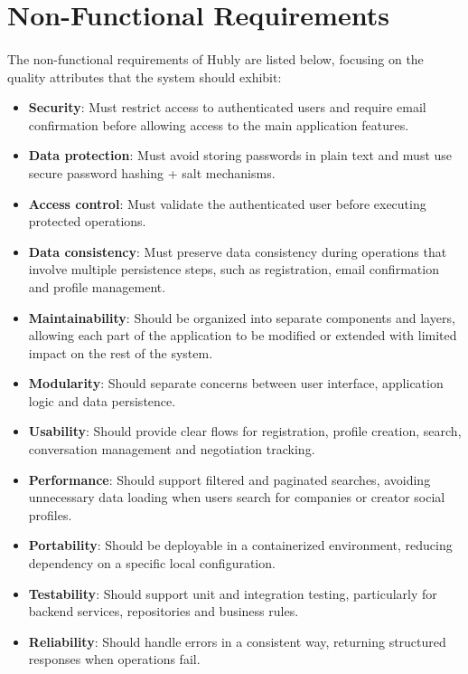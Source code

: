 \section{Non-Functional Requirements}
\paragraph{}The non-functional requirements of Hubly are listed below, focusing on the quality attributes that the system should exhibit:

\begin{itemize}
    \item \textbf{Security}: Must restrict access to authenticated users and require email confirmation before allowing access to the main application features.

    \item \textbf{Data protection}: Must avoid storing passwords in plain text and must use secure password hashing + salt mechanisms.

    \item \textbf{Access control}: Must validate the authenticated user before executing protected operations.

    \item \textbf{Data consistency}: Must preserve data consistency during operations that involve multiple persistence steps, such as registration, email confirmation and profile management.

    \item \textbf{Maintainability}: Should be organized into separate components and layers, allowing each part of the application to be modified or extended with limited impact on the rest of the system.

    \item \textbf{Modularity}: Should separate concerns between user interface, application logic and data persistence.

    \item \textbf{Usability}: Should provide clear flows for registration, profile creation, search, conversation management and negotiation tracking.

    \item \textbf{Performance}: Should support filtered and paginated searches, avoiding unnecessary data loading when users search for companies or creator social profiles.

    \item \textbf{Portability}: Should be deployable in a containerized environment, reducing dependency on a specific local configuration.

    \item \textbf{Testability}: Should support unit and integration testing, particularly for backend services, repositories and business rules.

    \item \textbf{Reliability}: Should handle errors in a consistent way, returning structured responses when operations fail.
\end{itemize}
